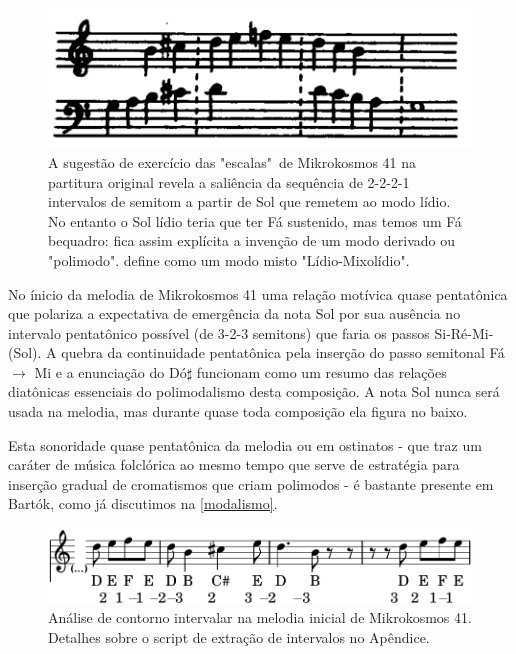 \documentclass[
	12pt,				%
	openright,			%
	twoside,			%
	a4paper,			%
	english,			%
	french,				%
	spanish,			%
	brazil				%
	]{abntex2}
\begin{document}
\begin{figure}[!h]
	\caption{\label{fig_grafico}A sugestão de exercício das "escalas"\ de Mikrokosmos 41 na partitura original revela a saliência da sequência de 2-2-2-1 intervalos de semitom a partir de Sol que remetem ao modo lídio. No entanto o Sol lídio teria que ter Fá sustenido, mas temos um Fá bequadro: fica assim explícita a invenção de um modo derivado ou "polimodo".  define como um modo misto "Lídio-Mixolídio". } 
	\begin{center}
	    \includegraphics[scale=0.3]{estudosM21/mikro041_exercicio.png}
	\end{center}
\end{figure}


No ínicio da melodia de Mikrokosmos 41 uma relação motívica quase pentatônica que polariza a expectativa de emergência da nota Sol por sua ausência no intervalo pentatônico possível (de 3-2-3 semitons) que faria os passos Si-Ré-Mi-(Sol). A quebra da continuidade pentatônica pela inserção do passo semitonal Fá $ \rightarrow $ Mi e a enunciação do Dó$\sharp$ funcionam como um resumo das relações diatônicas essenciais do polimodalismo desta composição. A nota Sol nunca será usada na melodia, mas durante quase toda composição  ela figura no baixo.

Esta sonoridade quase pentatônica da melodia ou em ostinatos - que traz um caráter de música folclórica ao mesmo tempo que serve de estratégia para inserção gradual de cromatismos que criam polimodos - é bastante presente em Bartók, como já discutimos na \autoref{modalismo}.

\begin{figure}[!h]
	\caption{\label{fig_grafico} Análise de contorno intervalar na melodia inicial de Mikrokosmos 41. Detalhes sobre o script de extração de intervalos no Apêndice.  } 
	\begin{center}
	    \includegraphics[scale=0.3]{estudosM21/mikro041_contorno01.png}
	\end{center}
\end{figure}
\end{document}
